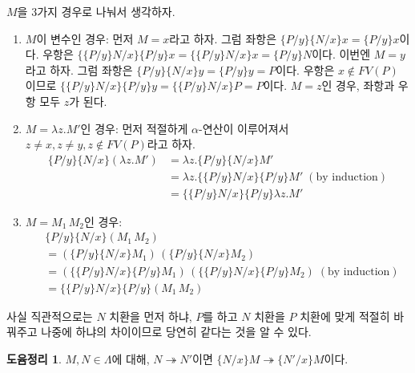 \documentclass[b5paper, 10pt]{book}
\theoremstyle{definition}
\newtheorem{lem}[defn]{도윰정리}
\newenvironment{pf*}{\pushQED{\qed}\pf}{\popQED\endpf}
\begin{document}
\begin{pf*}
    $M$을 3가지 경우로 나눠서 생각하자.
    \begin{enumerate}
        \item $M$이 변수인 경우: 
        먼저 $M = x$라고 하자. 그럼 좌항은 $\{P / y\} \{ N / x\} x = \{ P / y\} x$이다. 우항은
        $\{ \{P / y\} N / x \} \{P / y\} x = \{ \{P / y\} N / x \} x = \{P / y\} N$이다. 
        이번엔 $M = y$라고 하자. 그럼 좌항은 $\{P / y\} \{ N / x\} y = \{ P / y\} y = P$이다.
        우항은 $x \notin FV(P)$ 이므로 
        $\{ \{P / y\} N / x \} \{P / y\}  y = \{ \{P / y\} N / x \} P = P $이다. 
        $M= z$인 경우, 좌항과 우항 모두 $z$가 된다.
        \item $M = \lambda z. M'$인 경우: 먼저 적절하게 $\alpha$-연산이 이루어져서 $z \neq x,
        z \neq y, z \notin FV(P)$라고 하자.  
        \begin{align*}
            \{P / y\} \{ N / x\} (\lambda z. M') &= \lambda z. \{P / y\} \{ N / x\}  M' \\ 
            &=  \lambda z. \{ \{P / y\} N / x \} \{P / y \}  M' \; (\text{by induction})\\ 
            &=   \{ \{P / y\} N / x \} \{P / y \}  \lambda z. M' 
        \end{align*}
        \item $M = M_1 \, M_2$인 경우:
        \begin{align*}
            &\{P / y\} \{ N / x\} (M_1 \, M_2) \\ 
            & = (\{P / y\} \{ N / x\} M_1 ) \, 
            ( \{P / y\} \{ N / x\} M_2) \\
            &= (\{ \{P / y\} N / x \} \{P / y \} M_1) \, 
            (\{ \{P / y\} N / x \} \{P / y \} M_2) \; (\text{by induction}) \\
            &= \{ \{P / y\} N / x \} \{P / y \} (M_1 \, M_2)
        \end{align*}
    \end{enumerate}
\end{pf*}
사실 직관적으로는 $N$ 치환을 먼저 하냐, $P$를 하고 $N$ 치환을 $P$ 치환에 맞게 적절히 바꿔주고
나중에 하냐의 차이이므로 당연히 같다는 것을 알 수 있다.
\begin{lem} \label{lem3}
    $M, N \in \Lambda$에 대해, $N \twoheadrightarrow N'$이면 
    $\{N / x\}M \twoheadrightarrow \{N' / x\}M$이다.
\end{lem}
\end{document}
